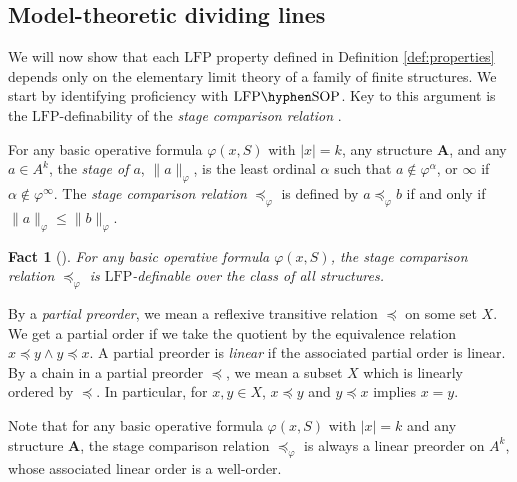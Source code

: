 \documentclass{lmcs}
\newcommand{\LFP}{\mathrm{LFP}}
\newcommand{\LFPP}[1]{\LFP\hyphen#1}
\newcommand{\SOP}{\mathrm{SOP}}
\newcommand{\A}{\mathbf{A}}
\theoremstyle{thmC}
\newtheorem{factC}[thm]{Fact}
\begin{document}
\subsection{Model-theoretic dividing lines}

We will now show that each $\LFP$ property defined in Definition \ref{def:properties} depends only on the elementary limit theory of a family of finite structures. We start by identifying  proficiency with $\LFPP{\SOP}$. Key to this argument is the $\LFP$-definability of the \emph{stage comparison relation} \cite{Mos}.

\begin{defi}
For any basic operative formula $\varphi(x,S)$ with $|x| = k$, any structure $\A$, and any $a\in A^k$, the \emph{stage of $a$},  $\|a\|_\varphi$, is the least ordinal $\alpha$ such that $a\notin \varphi^\alpha$, or $\infty$ if $\alpha\notin \varphi^\infty$. The \emph{stage comparison relation} $\preceq_\varphi$ is defined by $a \preceq_\varphi b$ if and only if $\|a\|_\varphi \leq \|b\|_\varphi$. 
\end{defi}

\begin{factC}[{\cite[Theorem 2A.2]{Mos}}]\label{fact:stagecomp}
For any basic operative formula $\varphi(x,S)$, the stage comparison relation $\preceq_\varphi$ is $\LFP$-definable over the class of all structures.
\end{factC}

By a \emph{partial preorder}, we mean a reflexive transitive relation $\preceq$ on some set $X$. We get a partial order if we take the quotient by the equivalence relation $x \preceq y \wedge y \preceq x$. A partial preorder is \emph{linear} if the associated partial order is linear. By a chain in a partial preorder $\preceq$, we mean a subset $X$ which is linearly ordered by $\preceq$. In particular, for $x,y\in X$, $x\preceq y$ and $y\preceq x$ implies $x = y$. 

Note that for any basic operative formula $\varphi(x,S)$ with $|x| = k$ and any structure $\A$, the stage comparison relation $\preceq_\varphi$ is always a linear preorder on $A^k$, whose associated linear order is a well-order.
\end{document}
